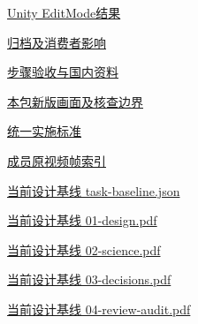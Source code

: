 \documentclass[11pt,a4paper]{article}
\begin{document}
\href{file:///D:/Agent/srp/agent/tasks/U-04/evidence/editmode-results.xml}{Unity EditMode结果}


\href{file:///D:/Agent/srp/agent/tasks/U-04/evidence/consumer-impact.md}{归档及消费者影响}


\href{file:///D:/Agent/srp/agent/tasks/U-04/TASK.md}{步骤验收与国内资料}


\href{file:///D:/Agent/srp/agent/tasks/U-04/outputs/current-implementation-evidence.md}{本包新版画面及核查边界}


\href{file:///D:/Agent/srp/agent/design/weather/2026-10-08_Storm\%E4\%B8\%8E\%E7\%BA\%AF\%E7\%B2\%92\%E5\%AD\%90\%E5\%8F\%8C\%E7\%8E\%AF\%E5\%AE\%9E\%E6\%96\%BD\%E6\%A0\%87\%E5\%87\%86.md}{统一实施标准}


\href{file:///D:/Agent/srp/human/assets/previews/2026-10-08/member-storm-particle-rings/frame-index.json}{成员原视频帧索引}


\href{file:///D:/Agent/srp/agent/design/design-foundation-20261008/task-baseline.json}{当前设计基线 task-\allowbreak{}baseline.json}


\href{file:///D:/Agent/srp/agent/design/design-foundation-20261008/01-design.pdf}{当前设计基线 01-\allowbreak{}design.pdf}


\href{file:///D:/Agent/srp/agent/design/design-foundation-20261008/02-science.pdf}{当前设计基线 02-\allowbreak{}science.pdf}


\href{file:///D:/Agent/srp/agent/design/design-foundation-20261008/03-decisions.pdf}{当前设计基线 03-\allowbreak{}decisions.pdf}


\href{file:///D:/Agent/srp/agent/design/design-foundation-20261008/04-review-audit.pdf}{当前设计基线 04-\allowbreak{}review-\allowbreak{}audit.pdf}
\end{document}
